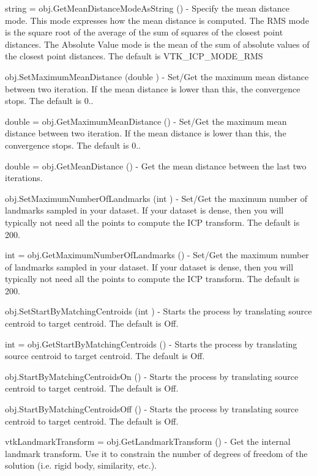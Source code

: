 \begin{DoxyItemize}
\item {\ttfamily string = obj.\-Get\-Mean\-Distance\-Mode\-As\-String ()} -\/ Specify the mean distance mode. This mode expresses how the mean distance is computed. The R\-M\-S mode is the square root of the average of the sum of squares of the closest point distances. The Absolute Value mode is the mean of the sum of absolute values of the closest point distances. The default is V\-T\-K\-\_\-\-I\-C\-P\-\_\-\-M\-O\-D\-E\-\_\-\-R\-M\-S  
\item {\ttfamily obj.\-Set\-Maximum\-Mean\-Distance (double )} -\/ Set/\-Get the maximum mean distance between two iteration. If the mean distance is lower than this, the convergence stops. The default is 0..  
\item {\ttfamily double = obj.\-Get\-Maximum\-Mean\-Distance ()} -\/ Set/\-Get the maximum mean distance between two iteration. If the mean distance is lower than this, the convergence stops. The default is 0..  
\item {\ttfamily double = obj.\-Get\-Mean\-Distance ()} -\/ Get the mean distance between the last two iterations.  
\item {\ttfamily obj.\-Set\-Maximum\-Number\-Of\-Landmarks (int )} -\/ Set/\-Get the maximum number of landmarks sampled in your dataset. If your dataset is dense, then you will typically not need all the points to compute the I\-C\-P transform. The default is 200.  
\item {\ttfamily int = obj.\-Get\-Maximum\-Number\-Of\-Landmarks ()} -\/ Set/\-Get the maximum number of landmarks sampled in your dataset. If your dataset is dense, then you will typically not need all the points to compute the I\-C\-P transform. The default is 200.  
\item {\ttfamily obj.\-Set\-Start\-By\-Matching\-Centroids (int )} -\/ Starts the process by translating source centroid to target centroid. The default is Off.  
\item {\ttfamily int = obj.\-Get\-Start\-By\-Matching\-Centroids ()} -\/ Starts the process by translating source centroid to target centroid. The default is Off.  
\item {\ttfamily obj.\-Start\-By\-Matching\-Centroids\-On ()} -\/ Starts the process by translating source centroid to target centroid. The default is Off.  
\item {\ttfamily obj.\-Start\-By\-Matching\-Centroids\-Off ()} -\/ Starts the process by translating source centroid to target centroid. The default is Off.  
\item {\ttfamily vtk\-Landmark\-Transform = obj.\-Get\-Landmark\-Transform ()} -\/ Get the internal landmark transform. Use it to constrain the number of degrees of freedom of the solution (i.\-e. rigid body, similarity, etc.).  

\end{DoxyItemize}
